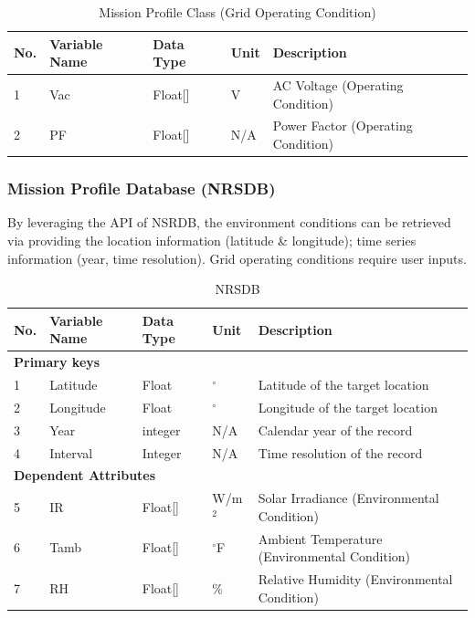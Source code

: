 \documentclass{article}
\begin{document}
\begin{table}[h]
\centering
\caption{Mission Profile Class (Grid Operating Condition)}
\begin{tabular}{|l|l|l|l|p{6cm}|}
\hline
\textbf{No.} & \textbf{Variable Name} & \textbf{Data Type} & \textbf{Unit} & \textbf{Description} \\ \hline
1 & Vac & Float[] & V & AC Voltage (Operating Condition) \\ \hline
2 & PF & Float[] & N/A & Power Factor (Operating Condition) \\ \hline
\end{tabular}
\end{table}

\subsubsection{Mission Profile Database (NRSDB)}
By leveraging the API of NSRDB, the environment conditions can be retrieved via providing the location information (latitude \& longitude); time series information (year, time resolution). Grid operating conditions require user inputs.

\begin{table}[h]
\centering
\caption{NRSDB}
\begin{tabular}{|l|l|l|l|p{6cm}|}
\hline
\textbf{No.} & \textbf{Variable Name} & \textbf{Data Type} & \textbf{Unit} & \textbf{Description} \\ \hline
\multicolumn{5}{|l|}{\textbf{Primary keys}} \\ \hline
1 & Latitude & Float & $^\circ$ & Latitude of the target location \\ \hline
2 & Longitude & Float & $^\circ$ & Longitude of the target location \\ \hline
3 & Year & integer & N/A & Calendar year of the record \\ \hline
4 & Interval & Integer & N/A & Time resolution of the record \\ \hline
\multicolumn{5}{|l|}{\textbf{Dependent Attributes}} \\ \hline
5 & IR & Float[] & W/m$^2$ & Solar Irradiance (Environmental Condition) \\ \hline
6 & Tamb & Float[] & $^\circ$F & Ambient Temperature (Environmental Condition) \\ \hline
7 & RH & Float[] & \% & Relative Humidity (Environmental Condition) \\ \hline
\end{tabular}
\end{table}
\end{document}
